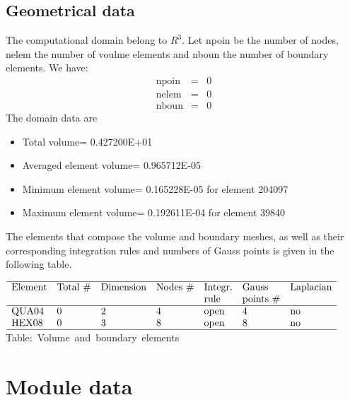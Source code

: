 \documentclass[10pt]{article}
\begin{document}
\subsection{Geometrical data}
The computational domain belong to
$R^3$.
Let npoin be the number of nodes, nelem the number
of voulme elements and nboun the number of boundary elements.
We have:
\begin{eqnarray*}
 \mbox{npoin} &=&        0 \\
 \mbox{nelem} &=&        0 \\
 \mbox{nboun} &=&        0
\end{eqnarray*}
The domain data are
\begin{itemize}
   \item Total volume= 0.427200E+01
   \item Averaged element volume= 0.965712E-05
   \item Minimum element volume= 0.165228E-05
         for element 204097
   \item Maximum element volume= 0.192611E-04
         for element 39840
\end{itemize}
The elements that compose the volume and boundary meshes, as well
as their corresponding integration rules and numbers of Gauss points
is given in the following table.
\begin{center}
\begin{math}
\begin{array}{lllllll}
\hline
\textrm{Element} & \textrm{Total \#}  & \textrm{Dimension} & \textrm{Nodes \#} & 
\textrm{Integr.} & \textrm{Gauss}     & \textrm{Laplacian} \\
\textrm{}        & \textrm{}          & \textrm{}          & \textrm{} & 
\textrm{rule}    & \textrm{points \#} & \textrm{} \\
\hline
\textrm{QUA04} &         0 & 2 &  4 & \textrm{open} &  4 & \textrm{no}\\
\textrm{HEX08} &         0 & 3 &  8 & \textrm{open} &  8 & \textrm{no}\\
\hline
\end{array}
\end{math}
\mbox{Table: Volume and boundary elements}
\end{center}
\section{Module data}
\end{document}
